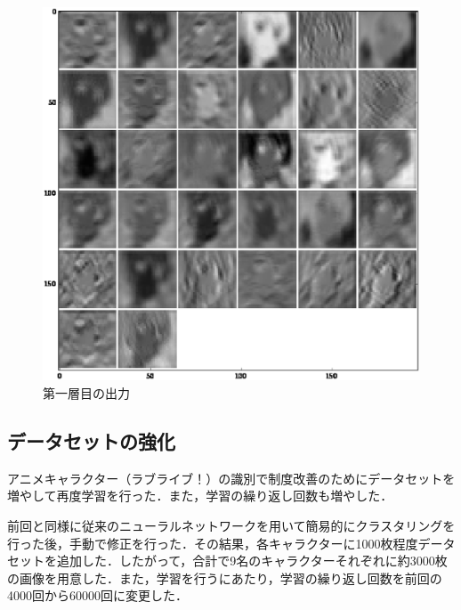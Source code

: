 \documentclass[a4paper,10pt]{jsarticle}
\begin{document}
\begin{figure}[tb]
 \begin{center}
  \includegraphics[clip,width=12cm]{./fig/eps/outputeri.eps}
 \end{center}
 \caption{第一層目の出力}
 \label{outputeri}
\end{figure}

\subsection{データセットの強化}

アニメキャラクター（ラブライブ！）の識別で制度改善のためにデータセットを増やして再度学習を行った．また，学習の繰り返し回数も増やした．

前回と同様に従来のニューラルネットワークを用いて簡易的にクラスタリングを行った後，手動で修正を行った．その結果，各キャラクターに1000枚程度データセットを追加した．したがって，合計で9名のキャラクターそれぞれに約3000枚の画像を用意した．また，学習を行うにあたり，学習の繰り返し回数を前回の4000回から60000回に変更した．
\end{document}
